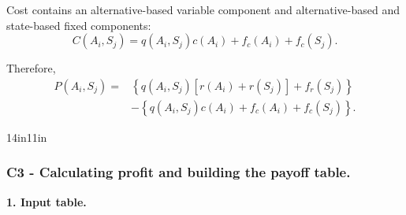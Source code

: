 	Cost contains an alternative-based variable component and alternative-based
	and state-based fixed components:
	\[
	C(A_i,S_j)
	=
	q(A_i,S_j)c(A_i)
	+
	f_c(A_i)
	+
	f_c(S_j).
	\]

	Therefore,
	\[
	\begin{aligned}
		P(A_i,S_j)
		={}&
		\left\{
		q(A_i,S_j)
		\left[
		r(A_i)+r(S_j)
		\right]
		+
		f_r(S_j)
		\right\}
		\\
		&-
		\left\{
		q(A_i,S_j)c(A_i)
		+
		f_c(A_i)
		+
		f_c(S_j)
		\right\}.
	\end{aligned}
	\]


	\begin{CalculationLandscape}{14in}{11in}
\subsubsection*{C3 - Calculating profit and building the payoff table.}
	\label{subsec:problem16-solar-installation-programme-c3}

\textbf{1. Input table.}


\end{CalculationLandscape}
